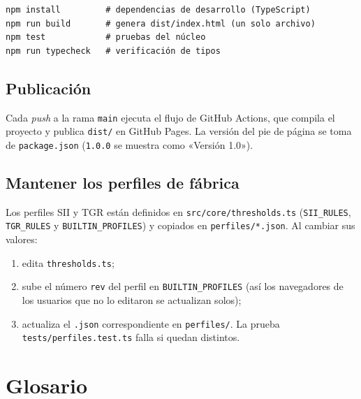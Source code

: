 \documentclass[11pt,a4paper,oneside]{report}
\begin{document}
\begin{lstlisting}
npm install         # dependencias de desarrollo (TypeScript)
npm run build       # genera dist/index.html (un solo archivo)
npm test            # pruebas del núcleo
npm run typecheck   # verificación de tipos
\end{lstlisting}

\section{Publicación}

Cada \emph{push} a la rama \texttt{main} ejecuta el flujo de GitHub Actions,
que compila el proyecto y publica \texttt{dist/} en GitHub Pages. La versión
del pie de página se toma de \texttt{package.json} (\texttt{1.0.0} se muestra
como «Versión 1.0»).

\section{Mantener los perfiles de fábrica}

Los perfiles SII y TGR están definidos en \texttt{src/core/thresholds.ts}
(\texttt{SII\_RULES}, \texttt{TGR\_RULES} y \texttt{BUILTIN\_PROFILES}) y
copiados en \texttt{perfiles/*.json}. Al cambiar sus valores:
\begin{enumerate}
  \item edita \texttt{thresholds.ts};
  \item sube el número \texttt{rev} del perfil en \texttt{BUILTIN\_PROFILES}
        (así los navegadores de los usuarios que no lo editaron se actualizan
        solos);
  \item actualiza el \texttt{.json} correspondiente en \texttt{perfiles/}. La
        prueba \texttt{tests/perfiles.test.ts} falla si quedan distintos.
\end{enumerate}

\chapter{Glosario}
\end{document}
